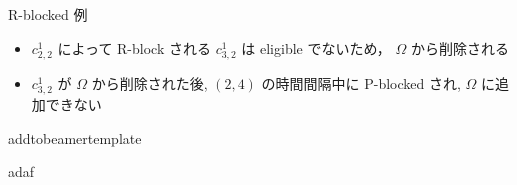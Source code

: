 \begin{frame}{R-blocked 例}
    \vspace{\headerheight}
    \centering
\end{frame}

\begin{frame}{}
    \begin{itemize}
        \item $c_{2,2}^{1}$ によって R-block される $c_{3,2}^{1}$ は eligible でないため， $\Omega$ から削除される
        \item $c_{3,2}^{1}$ が $\Omega$ から削除された後, $(2,4)$ の時間間隔中に P-blocked され, $\Omega$ に追加できない
    \end{itemize}
\end{frame}

\begin{frame}{}
    \begin{theorem}[test]
        addtobeamertemplate
    \end{theorem}

    \begin{lemma}[ada]
        adaf
    \end{lemma}
\end{frame}
